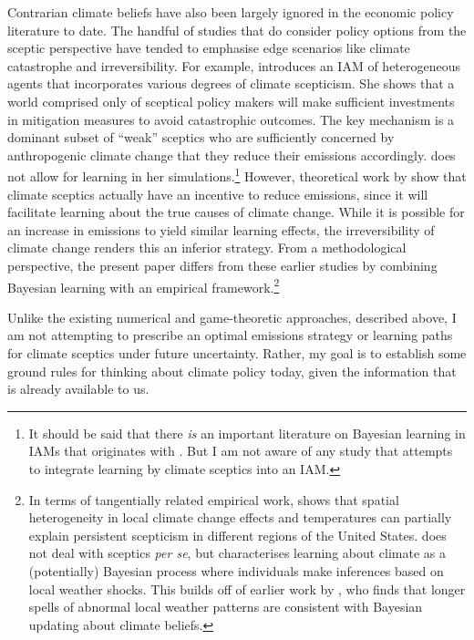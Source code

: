 \documentclass[smallextended]{svjour3}       %
\begin{document}
Contrarian climate beliefs have also been largely ignored in the
economic policy literature to date. The handful of studies that do
consider policy options from the sceptic perspective have tended to
emphasise edge scenarios like climate catastrophe and irreversibility.
For example, \cite{kiseleva2016heterogeneous} introduces an IAM of
heterogeneous agents that incorporates various degrees of climate
scepticism. She shows that a world comprised only of sceptical policy
makers will make sufficient investments in mitigation measures to avoid
catastrophic outcomes. The key mechanism is a dominant subset of
``weak'' sceptics who are sufficiently concerned by anthropogenic
climate change that they reduce their emissions accordingly.
\cite{kiseleva2016heterogeneous} does not allow for learning in her
simulations.\footnote{It should be said that there \emph{is} an
  important literature on Bayesian learning in IAMs that originates with
  \cite{kelly1999learning}. But I am not aware of any study that
  attempts to integrate learning by climate sceptics into an IAM.}
However, theoretical work by \cite{wijnbergen2015skeptics} show that
climate sceptics actually have an incentive to reduce emissions, since
it will facilitate learning about the true causes of climate change.
While it is possible for an increase in emissions to yield similar
learning effects, the irreversibility of climate change renders this an
inferior strategy. From a methodological perspective, the present paper
differs from these earlier studies by combining Bayesian learning with
an empirical framework.\footnote{In terms of tangentially related
  empirical work, \cite{kaufmann2017spatial} shows that spatial
  heterogeneity in local climate change effects and temperatures can
  partially explain persistent scepticism in different regions of the
  United States. \cite{moore2017learning} does not deal with sceptics
  \emph{per se}, but characterises learning about climate as a
  (potentially) Bayesian process where individuals make inferences based
  on local weather shocks. This builds off of earlier work by
  \cite{deryugina2013update}, who finds that longer spells of abnormal
  local weather patterns are consistent with Bayesian updating about
  climate beliefs.}

Unlike the existing numerical and game-theoretic approaches, described
above, I am not attempting to prescribe an optimal emissions strategy or
learning paths for climate sceptics under future uncertainty. Rather, my
goal is to establish some ground rules for thinking about climate policy
today, given the information that is already available to us.
\end{document}
